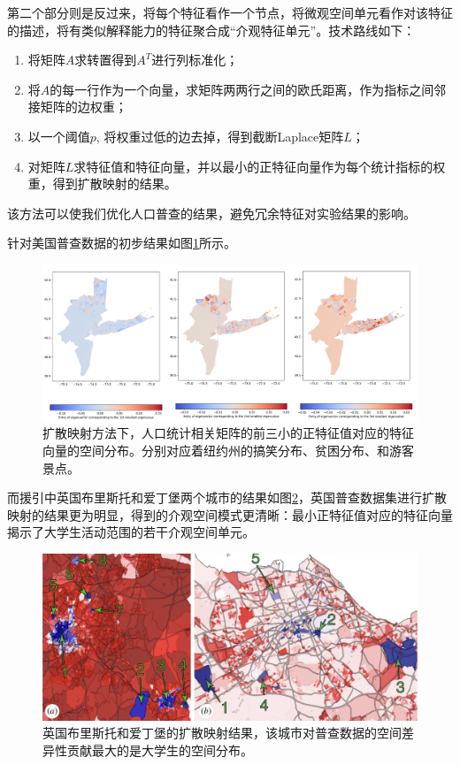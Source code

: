 第二个部分则是反过来，将每个特征看作一个节点，将微观空间单元看作对该特征的描述，将有类似解释能力的特征聚合成“介观特征单元”。技术路线如下：\begin{enumerate}
    \item 将矩阵$A$求转置得到$A^T$进行列标准化；
    \item 将$A$的每一行作为一个向量，求矩阵两两行之间的欧氏距离，作为指标之间邻接矩阵的边权重；
    \item 以一个阈值$p$, 将权重过低的边去掉，得到截断Laplace矩阵$L$；
    \item 对矩阵$L$求特征值和特征向量，并以最小的正特征向量作为每个统计指标的权重，得到扩散映射的结果。
\end{enumerate} 该方法可以使我们优化人口普查的结果，避免冗余特征对实验结果的影响。

针对美国普查数据的初步结果如图\ref{fig:diffusionmap}所示。

\begin{figure}[h]
    \centering
    \includegraphics[width = 0.99\linewidth]{Figs/diffusionmap.png}
    \caption{扩散映射方法下，人口统计相关矩阵的前三小的正特征值对应的特征向量的空间分布。分别对应着纽约州的搞笑分布、贫困分布、和游客景点。}
    \label{fig:diffusionmap}
\end{figure}

而援引\cite{barter2019manifold}中英国布里斯托和爱丁堡两个城市的结果如图\ref{fig:manifoldcities}，英国普查数据集进行扩散映射的结果更为明显，得到的介观空间模式更清晰：最小正特征值对应的特征向量揭示了大学生活动范围的若干介观空间单元。

\begin{figure}[h]
    \centering
    \includegraphics[width = 0.99\linewidth]{Figs/manifoldcities.png}
    \caption{英国布里斯托和爱丁堡的扩散映射结果，该城市对普查数据的空间差异性贡献最大的是大学生的空间分布。}
    \label{fig:manifoldcities}
\end{figure}

